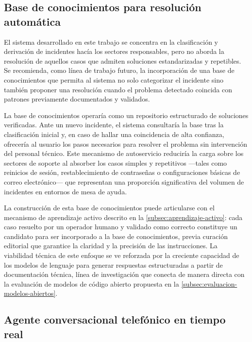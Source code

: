 \subsection{Base de conocimientos para resolución automática}\label{subsec:base-conocimientos}

El sistema desarrollado en este trabajo se concentra en la clasificación y derivación de incidentes hacía los sectores responsables, pero no aborda la resolución de aquellos casos que admiten soluciones estandarizadas y repetibles. Se recomienda, como línea de trabajo futuro, la incorporación de una base de conocimientos que permita al sistema no solo categorizar el incidente sino también proponer una resolución cuando el problema detectado coincida con patrones previamente documentados y validados.

La base de conocimientos operaría como un repositorio estructurado de soluciones verificadas. Ante un nuevo incidente, el sistema consultaría la base tras la clasificación inicial y, en caso de hallar una coincidencia de alta confianza, ofrecería al usuario los pasos necesarios para resolver el problema sin intervención del personal técnico. Este mecanismo de autoservicio reduciría la carga sobre los sectores de soporte al absorber los casos simples y repetitivos ---tales como reinicios de sesión, restablecimiento de contraseñas o configuraciones básicas de correo electrónico--- que representan una proporción significativa del volumen de incidentes en entornos de mesa de ayuda.

La construcción de esta base de conocimientos puede articularse con el mecanismo de aprendizaje activo descrito en la \autoref{subsec:aprendizaje-activo}: cada caso resuelto por un operador humano y validado como correcto constituye un candidato para ser incorporado a la base de conocimientos, previa curación editorial que garantice la claridad y la precisión de las instrucciones. La viabilidad técnica de este enfoque se ve reforzada por la creciente capacidad de los modelos de lenguaje para generar respuestas estructuradas a partir de documentación técnica, línea de investigación que conecta de manera directa con la evaluación de modelos de código abierto propuesta en la \autoref{subsec:evaluacion-modelos-abiertos}.

\subsection{Agente conversacional telefónico en tiempo real}\label{subsec:agente-conversacional}

